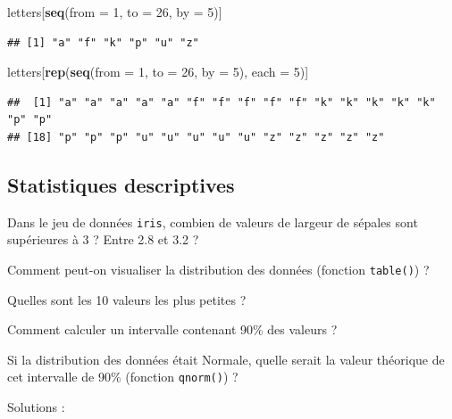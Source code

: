 \documentclass[]{book}
\newenvironment{Shaded}{\begin{snugshade}}{\end{snugshade}}
\newcommand{\DataTypeTok}[1]{\textcolor[rgb]{0.13,0.29,0.53}{#1}}
\newcommand{\DecValTok}[1]{\textcolor[rgb]{0.00,0.00,0.81}{#1}}
\newcommand{\KeywordTok}[1]{\textcolor[rgb]{0.13,0.29,0.53}{\textbf{#1}}}
\newcommand{\NormalTok}[1]{#1}
\newcommand{\OperatorTok}[1]{\textcolor[rgb]{0.81,0.36,0.00}{\textbf{#1}}}
\newcommand{\StringTok}[1]{\textcolor[rgb]{0.31,0.60,0.02}{#1}}
\begin{document}
\begin{Shaded}
\begin{Highlighting}[]
\NormalTok{letters[}\KeywordTok{seq}\NormalTok{(}\DataTypeTok{from =} \DecValTok{1}\NormalTok{, }\DataTypeTok{to =} \DecValTok{26}\NormalTok{, }\DataTypeTok{by =} \DecValTok{5}\NormalTok{)]}
\end{Highlighting}
\end{Shaded}

\begin{verbatim}
## [1] "a" "f" "k" "p" "u" "z"
\end{verbatim}

\begin{Shaded}
\begin{Highlighting}[]
\NormalTok{letters[}\KeywordTok{rep}\NormalTok{(}\KeywordTok{seq}\NormalTok{(}\DataTypeTok{from =} \DecValTok{1}\NormalTok{, }\DataTypeTok{to =} \DecValTok{26}\NormalTok{, }\DataTypeTok{by =} \DecValTok{5}\NormalTok{), }\DataTypeTok{each =} \DecValTok{5}\NormalTok{)]}
\end{Highlighting}
\end{Shaded}

\begin{verbatim}
##  [1] "a" "a" "a" "a" "a" "f" "f" "f" "f" "f" "k" "k" "k" "k" "k" "p" "p"
## [18] "p" "p" "p" "u" "u" "u" "u" "u" "z" "z" "z" "z" "z"
\end{verbatim}

\hypertarget{statistiques-descriptives-1}{%
\subsection{Statistiques descriptives}\label{statistiques-descriptives-1}}

Dans le jeu de données \texttt{iris}, combien de valeurs de largeur de sépales sont supérieures à 3 ? Entre 2.8 et 3.2 ?

Comment peut-on visualiser la distribution des données (fonction \texttt{table()}) ?

Quelles sont les 10 valeurs les plus petites ?

Comment calculer un intervalle contenant 90\% des valeurs ?

Si la distribution des données était Normale, quelle serait la valeur théorique de cet intervalle de 90\% (fonction \texttt{qnorm()}) ?

Solutions :

\begin{Shaded}
\end{Shaded}
\end{document}
